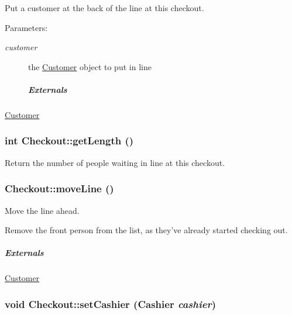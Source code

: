 Put a customer at the back of the line at this checkout. 

\begin{Desc}
\item[Parameters:]
\begin{description}
\item[{\em customer}]the \hyperlink{class_customer}{Customer} object to put in line \subparagraph*{Externals}\end{description}
\end{Desc}
\hyperlink{class_customer}{Customer} \hypertarget{class_checkout_ef70434478cfa2809da9b161751c522f}{
\subsubsection[{getLength}]{\setlength{\rightskip}{0pt plus 5cm}int Checkout::getLength ()}}
\label{class_checkout_ef70434478cfa2809da9b161751c522f}


Return the number of people waiting in line at this checkout. 

\hypertarget{class_checkout_d18d76d878a58d31583da42adc2c3777}{
\subsubsection[{moveLine}]{ Checkout::moveLine ()}}
\label{class_checkout_d18d76d878a58d31583da42adc2c3777}


Move the line ahead. 

Remove the front person from the list, as they've already started checking out.

\subparagraph*{Externals}

\hyperlink{class_customer}{Customer} \hypertarget{class_checkout_1ebc3d36b7c8c4a55b86e70f6054c0b1}{
\subsubsection[{setCashier}]{\setlength{\rightskip}{0pt plus 5cm}void Checkout::setCashier ({\bf Cashier} {\em cashier})}}
\label{class_checkout_1ebc3d36b7c8c4a55b86e70f6054c0b1}


